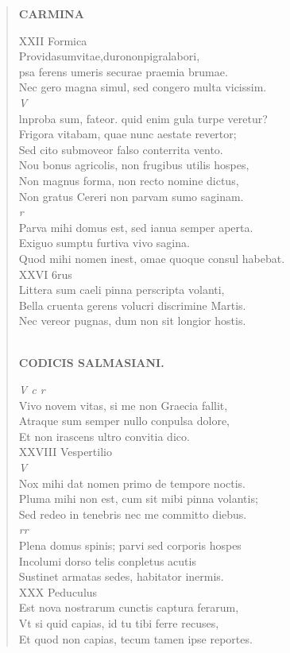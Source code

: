 \documentclass[11pt, a4paper]{report}
\begin{document}
\begin{verse}
     \marginpar{[228]} \begin{center} \textbf{CARMINA} \end{center}XXII Formica \\ Providasumvitae,durononpigralabori, \\ psa ferens umeris securae praemia brumae. \\ Nec gero magna simul, sed congero multa vicissim. \\ \textit{V} \\ lnproba sum, fateor. quid enim gula turpe veretur? \\ Frigora vitabam, quae nunc aestate revertor; \\ Sed cito submoveor falso conterrita vento. \\ Nou bonus agricolis, non frugibus utilis hospes, \\ Non magnus forma, non recto nomine dictus, \\ Non gratus Cereri non parvam sumo saginam. \\ \textit{r} \\ Parva mihi domus est, sed ianua semper aperta. \\ Exiguo sumptu furtiva vivo sagina. \\ Quod mihi nomen inest, omae quoque consul habebat. \\ XXVI 6rus \\ Littera sum caeli pinna perscripta volanti, \\ Bella cruenta gerens volucri discrimine Martis. \\ Nec vereor pugnas, dum non sit longior hostis. \\ 
        ﻿\pagebreak 
     \marginpar{[229]} \begin{center} \textbf{CODICIS SALMASIANI.} \end{center}\textit{V c r} \\ Vivo novem vitas, si me non Graecia fallit, \\ Atraque sum semper nullo conpulsa dolore, \\ Et non irascens ultro convitia dico. \\ XXVIII Vespertilio \\ \textit{V} \\ Nox mihi dat nomen primo de tempore noctis. \\ Pluma mihi non est, cum sit mibi pinna volantis; \\ Sed redeo in tenebris nec me committo diebus. \\ \textit{rr} \\ Plena domus spinis; parvi sed corporis hospes \\ Incolumi dorso telis conpletus acutis \\ Sustinet armatas sedes, habitator inermis. \\ XXX Peduculus \\ Est nova nostrarum cunctis captura ferarum, \\ Vt si quid capias, id tu tibi ferre recuses, \\ Et quod non capias, tecum tamen ipse reportes. \\ 

\end{verse}
\end{document}
